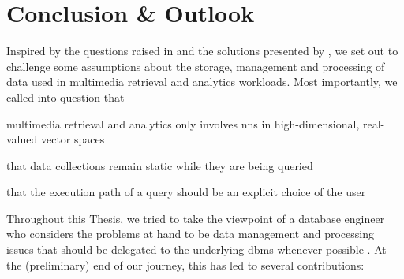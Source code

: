 \chapter{Conclusion \& Outlook}
\label{chapter:conclusion}


Inspired by the questions raised in \cite{Jonson:2016Ten} and the solutions presented by \cite{Giangreco:2018Database}, we set out to challenge some assumptions about the storage, management and processing of data used in multimedia retrieval and analytics workloads. Most importantly, we called into question that 
\begin{enumerate*}[label=(\roman*), itemjoin={{, }}, itemjoin*={{, and }}, after={{.}}]
    \item multimedia retrieval and analytics only involves \acrshort{nns} in high-dimensional, real-valued vector spaces
    \item that data collections remain static while they are being queried
    \item that  the execution path of a query should be an explicit choice of the user
\end{enumerate*} 
Throughout this Thesis, we tried to take the viewpoint of a database engineer who considers the problems at hand to be data management and processing issues that should be delegated to the underlying \acrshort{dbms} whenever possible \cite{Ferro:2014Bridging,Amsaleg:2014Database}. At the (preliminary) end of our journey, this has led to several contributions:

